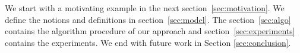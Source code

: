 

 We start with a motivating example in the next section~\ref{sec:motivation}.  We define the notions and definitions in section~\ref{sec:model}. The section~\ref{sec:algo} contains the  algorithm procedure of our approach and section~\ref{sec:experiments} contains the experiments. 
We end with future work in Section \ref{sec:conclusion}.




